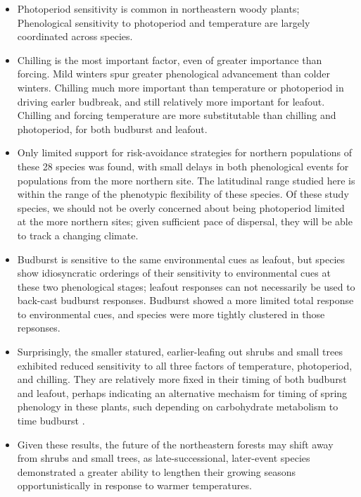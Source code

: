 \documentclass{article}
\begin{document}
\begin{itemize}

\item{Photoperiod sensitivity is common in northeastern woody plants; Phenological sensitivity to photoperiod and temperature are largely coordinated across species.}
\item{Chilling is the most important factor, even of greater importance than forcing. Mild winters spur greater phenological advancement than colder winters. Chilling much more important than temperature or photoperiod in driving earler budbreak, and still relatively more important for leafout. Chilling and forcing temperature are more substitutable than chilling and photoperiod, for both budburst and leafout.}
\item{Only limited support for risk-avoidance strategies for northern populations of these 28 species was found, with small delays in both phenological events for populations from the more northern site. The latitudinal range studied here is within the range of the phenotypic flexibility of these species. Of these study species, we should not be overly concerned about being photoperiod limited at the more northern sites; given sufficient pace of dispersal, they will be able to track a changing climate.}
\item{Budburst is sensitive to the same environmental cues as leafout, but species show idiosyncratic orderings of their sensitivity to environmental cues at these two phenological stages; leafout responses can not necessarily be used to back-cast budburst responses. Budburst showed a more limited total response to environmental cues, and species were more tightly clustered in those repsonses.}
\item{Surprisingly, the smaller statured, earlier-leafing out shrubs and small trees exhibited reduced sensitivity to all three factors of temperature, photoperiod, and chilling. They are relatively more fixed in their timing of both budburst and leafout, perhaps indicating an alternative mechaism for timing of spring phenology in these plants, such depending on carbohydrate metabolism to time budburst \cite{Pagter:2015}.}
\item{Given these results, the future of the northeastern forests may shift away from shrubs and small trees, as late-successional, later-event species demonstrated a greater ability to lengthen their growing seasons opportunistically in response to warmer temperatures.} %
\end{itemize}
\end{document}
